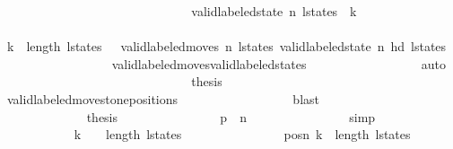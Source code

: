 \begin{isabellebody}
\ \ \ \ \ \ \ \ \ \ \ \ \ \ \isamarkupfalse%
\isanewline
\ \ \ \ \ \ \ \ \ \ \ \ \ \ \isamarkupfalse%
\ {\isachardoublequoteopen}valid{\isacharunderscore}labeled{\isacharunderscore}state\ n\ {\isacharparenleft}l{\isacharunderscore}states\ {\isacharbang}\ k{\isacharparenright}{\isachardoublequoteclose}\isanewline
\ \ \ \ \ \ \ \ \ \ \ \ \ \ \ \ \isamarkupfalse%
\ {\isacartoucheopen}k\ {\isacharless}\ length\ l{\isacharunderscore}states\ {\isacharminus}\ {}{\isacartoucheclose}\ {\isacartoucheopen}valid{\isacharunderscore}labeled{\isacharunderscore}moves\ n\ l{\isacharunderscore}states{\isacartoucheclose}\ {\isacartoucheopen}valid{\isacharunderscore}labeled{\isacharunderscore}state\ n\ {\isacharparenleft}hd\ l{\isacharunderscore}states{\isacharparenright}{\isacartoucheclose}\ \isanewline
\ \ \ \ \ \ \ \ \ \ \ \ \ \ \ \ \isamarkupfalse%
\ valid{\isacharunderscore}labeled{\isacharunderscore}moves{\isacharunderscore}valid{\isacharunderscore}labeled{\isacharunderscore}states\isanewline
\ \ \ \ \ \ \ \ \ \ \ \ \ \ \ \ \isamarkupfalse%
\ auto\isanewline
\ \ \ \ \ \ \ \ \ \ \ \ \ \ \isamarkupfalse%
\isanewline
\ \ \ \ \ \ \ \ \ \ \ \ \ \ \isamarkupfalse%
\ {\isacharquery}thesis\isanewline
\ \ \ \ \ \ \ \ \ \ \ \ \ \ \ \ \isamarkupfalse%
\ valid{\isacharunderscore}labeled{\isacharunderscore}move{\isacharprime}{\isacharunderscore}stone{\isacharunderscore}positions\isanewline
\ \ \ \ \ \ \ \ \ \ \ \ \ \ \ \ \isamarkupfalse%
\ blast\isanewline
\ \ \ \ \ \ \ \ \ \ \ \ \isamarkupfalse%
\isanewline
\ \ \ \ \ \ \ \ \ \ \ \ \isamarkupfalse%
\ {\isacharquery}thesis\isanewline
\ \ \ \ \ \ \ \ \ \ \ \ \ \ \isamarkupfalse%
\ {\isacharbackquoteopen}p{}{\isacharprime}\ {\isasymnoteq}\ n{\isacharbackquoteclose}\isanewline
\ \ \ \ \ \ \ \ \ \ \ \ \ \ \isamarkupfalse%
\ simp\isanewline
\ \ \ \ \ \ \ \ \ \ \isamarkupfalse%
\isanewline
\ \ \ \ \ \ \ \ \ \ \isamarkupfalse%
\ {\isachardoublequoteopen}k\ {\isacharplus}\ {}\ {\isacharless}\ length\ l{\isacharunderscore}states\ {\isacharminus}\ {}{\isachardoublequoteclose}\isanewline
\ \ \ \ \ \ \ \ \ \ \ \ \isamarkupfalse%
\ posn\ {\isacartoucheopen}k\ {\isacharless}\ length\ l{\isacharunderscore}states\ {\isacharminus}\ {}{\isacartoucheclose}\isanewline
\ \ \ \ \ \ \ \ \ \ \ \ \isamarkupfalse%

\end{isabellebody}
